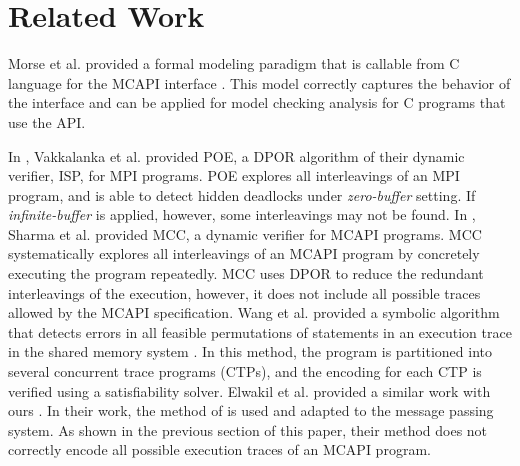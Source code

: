 \section{Related Work}
Morse et al. provided a formal modeling paradigm that is callable from C language for the MCAPI interface \cite{morse:vmcai12}. This model correctly captures the behavior of the interface and can be applied for model checking analysis for C programs that use the API.

In \cite{sarvani:fm09}, Vakkalanka et al. provided POE, a DPOR algorithm \cite{flanagan:popl05} of their dynamic verifier, ISP, for MPI programs. POE explores all interleavings of an MPI program, and is able to detect hidden deadlocks under \textit{zero-buffer} setting. If \textit{infinite-buffer} is applied, however, some interleavings may not be found. In \cite{sharma:fmcad09}, Sharma et al. provided MCC, a dynamic verifier for MCAPI programs. MCC systematically explores all interleavings of an MCAPI program by concretely executing the program repeatedly. MCC uses DPOR \cite{flanagan:popl05} to reduce the redundant interleavings of the execution, however, it does not include all possible traces allowed by the MCAPI specification. Wang et al. provided a symbolic algorithm that detects errors in all feasible permutations of statements in an execution trace in the shared memory system \cite{wang:fse09}. In this method, the program is partitioned into several concurrent trace programs (CTPs), and the encoding for each CTP is verified using a satisfiability solver. Elwakil et al. provided a similar work with ours \cite{elwakil:atva10,elwakil:padtad10}. In their work, the method of \cite{wang:fse09} is used and adapted to the message passing system. As shown in the previous section of this paper, their method does not correctly encode all possible execution traces of an MCAPI program.

